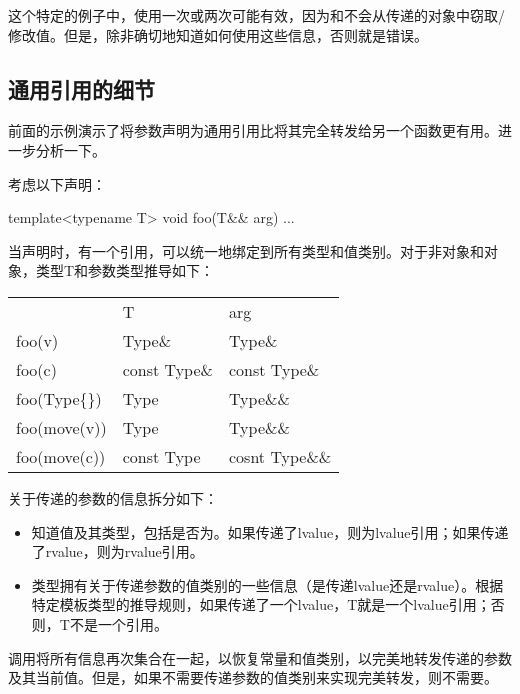 这个特定的例子中，使用一次或两次可能有效，因为和不会从传递的对象中窃取/修改值。但是，除非确切地知道如何使用这些信息，否则就是错误。

\subsection{通用引用的细节}

前面的示例演示了将参数声明为通用引用比将其完全转发给另一个函数更有用。进一步分析一下。

考虑以下声明：

\begin{cppcode}
template<typename T>
void foo(T&& arg) {
	...
}
\end{cppcode}

当声明时，有一个引用，可以统一地绑定到所有类型和值类别。对于非对象和对象，类型T和参数类型推导如下：

\begin{table}[H]
	\begin{tabular}{lll}
		& T            & arg            \\
		foo(v)        & Type\&       & Type\&         \\
		foo(c)        & const Type\& & const Type\&   \\
		foo(Type\{\}) & Type         & Type\&\&       \\
		foo(move(v))  & Type         & Type\&\&       \\
		foo(move(c))  & const Type   & cosnt Type\&\&
	\end{tabular}
\end{table}

关于传递的参数的信息拆分如下：

\begin{itemize}
	\item {}知道值及其类型，包括是否为。如果传递了lvalue，则为lvalue引用；如果传递了rvalue，则为rvalue引用。
	\item {}类型拥有关于传递参数的值类别的一些信息（是传递lvalue还是rvalue）。根据特定模板类型的推导规则，如果传递了一个lvalue，T就是一个lvalue引用；否则，T不是一个引用。
\end{itemize}

调用将所有信息再次集合在一起，以恢复常量和值类别，以完美地转发传递的参数及其当前值。但是，如果不需要传递参数的值类别来实现完美转发，则不需要。

